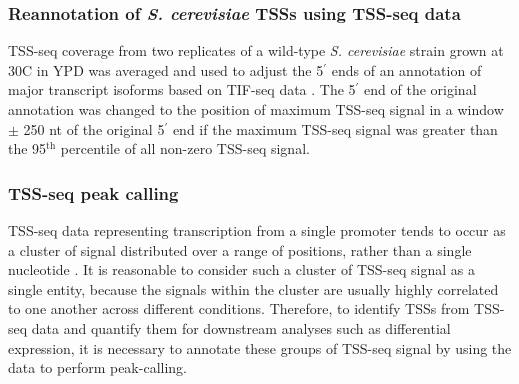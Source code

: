 \subsubsection{Reannotation of \textit{S. cerevisiae} TSSs using TSS-seq data}

TSS-seq coverage from two replicates of a wild-type \textit{S. cerevisiae} strain grown at 30\textdegree C in YPD was averaged and used to adjust the 5$^\prime$ ends of an annotation of major transcript isoforms based on TIF-seq data \citep{pelechano2013}.
The 5$^\prime$ end of the original annotation was changed to the position of maximum TSS-seq signal in a window $\pm$ 250 nt of the original 5$^\prime$ end if the maximum TSS-seq signal was greater than the 95$^\text{th}$ percentile of all non-zero TSS-seq signal.

\subsubsection{TSS-seq peak calling}
\label{subsubsec:tss_peak_calling}

TSS-seq data representing transcription from a single promoter tends to occur as a cluster of signal distributed over a range of positions, rather than a single nucleotide \citep{arribere2013, malabat2015}.
It is reasonable to consider such a cluster of TSS-seq signal as a single entity, because the signals within the cluster are usually highly correlated to one another across different conditions.
Therefore, to identify TSSs from TSS-seq data and quantify them for downstream analyses such as differential expression, it is necessary to annotate these groups of TSS-seq signal by using the data to perform peak-calling.

